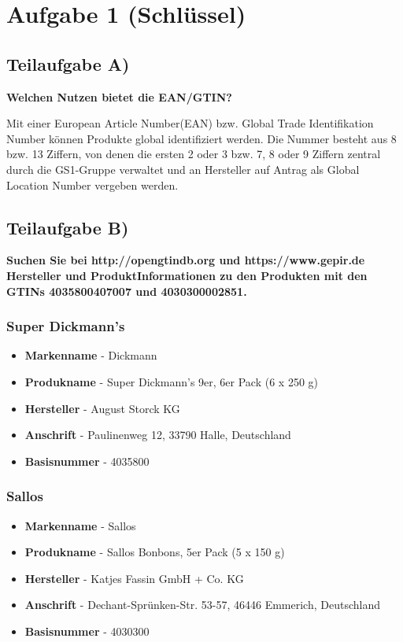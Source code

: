 \section{Aufgabe 1 (Schlüssel)}

\subsection{Teilaufgabe A)}
\textbf{Welchen Nutzen bietet die EAN/GTIN?}

Mit einer European Article Number(EAN) bzw. Global Trade Identifikation Number 
können Produkte global identifiziert werden. Die Nummer besteht aus 8 bzw. 13
Ziffern, von denen die ersten 2 oder 3 bzw. 7, 8 oder 9 Ziffern zentral durch die GS1-Gruppe verwaltet
und an Hersteller auf Antrag als Global Location Number vergeben werden.

\subsection{Teilaufgabe B)}
\textbf{Suchen Sie bei http://opengtindb.org und https://www.gepir.de Hersteller und ProduktInformationen
zu den Produkten mit den GTINs 4035800407007 und 4030300002851.}
\subsubsection{Super Dickmann's}


\begin{itemize}
  \item \textbf{Markenname} - {Dickmann}
  \item \textbf{Produkname} - {Super Dickmann's 9er, 6er Pack (6 x 250 g)}
  \item \textbf{Hersteller} - {August Storck KG}
  \item \textbf{Anschrift} - {Paulinenweg 12,
33790 Halle,
Deutschland}
\item \textbf{Basisnummer} - {4035800}
\end{itemize}

\begin{center}
\end{center}

\subsubsection{Sallos}

\begin{itemize}
  \item \textbf{Markenname} - {Sallos}
  \item \textbf{Produkname} - {Sallos Bonbons, 5er Pack (5 x 150 g)}
  \item \textbf{Hersteller} - {Katjes Fassin GmbH + Co. KG}
  \item \textbf{Anschrift} - {Dechant-Sprünken-Str. 53-57,
46446 Emmerich,
Deutschland}
\item \textbf{Basisnummer} - {4030300}
\end{itemize}

